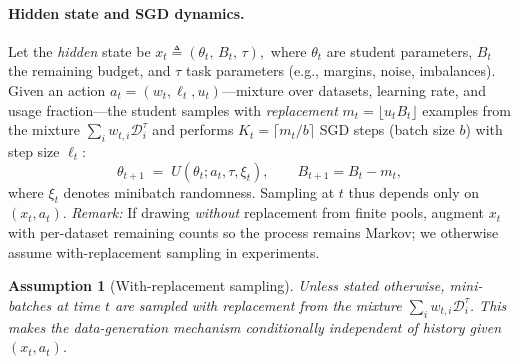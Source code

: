 \documentclass[11pt]{article}
\newtheorem{assumption}{Assumption}
\newcommand{\1}{\mathbf{1}}
\begin{document}
\paragraph{Hidden state and SGD dynamics.}
Let the \emph{hidden} state be
\(
x_t \triangleq (\theta_t,\,B_t,\,\tau),
\)
where $\theta_t$ are student parameters, $B_t$ the remaining budget, and $\tau$ task parameters (e.g., margins, noise, imbalances).
Given an action $a_t=(w_t,\ell_t,u_t)$---mixture over datasets, learning rate, and usage fraction---the student samples with \emph{replacement} $m_t=\lfloor u_t B_t\rfloor$ examples from the mixture $\sum_i w_{t,i}\mathcal{D}_i^\tau$ and performs $K_t=\lceil m_t/b\rceil$ SGD steps (batch size $b$) with step size $\ell_t$:
\begin{equation}
\theta_{t+1} \;=\; U(\theta_t; a_t, \tau, \xi_t),\qquad B_{t+1}=B_t-m_t,
\end{equation}
where $\xi_t$ denotes minibatch randomness.
Sampling at $t$ thus depends only on $(x_t,a_t)$.
\textit{Remark:} If drawing \emph{without} replacement from finite pools, augment $x_t$ with per-dataset remaining counts so the process remains Markov; we otherwise assume with-replacement sampling in experiments.
\begin{assumption}[With-replacement sampling]\label{assump:with-repl}
Unless stated otherwise, mini-batches at time $t$ are sampled \emph{with replacement} from the mixture $\sum_i w_{t,i}\mathcal{D}_i^\tau$. This makes the data-generation mechanism conditionally independent of history given $(x_t,a_t)$.
\end{assumption}
\end{document}
